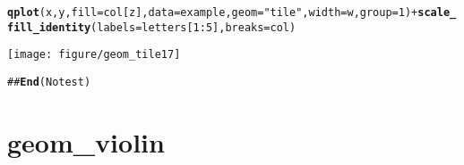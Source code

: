 \documentclass[a4paper,titlepage]{tufte-handout}\usepackage{graphicx, color}
\makeatletter
\def\maxwidth{ %
  \ifdim\Gin@nat@width>\linewidth
    \linewidth
  \else
    \Gin@nat@width
  \fi
}
\newcommand{\hlfunctioncall}[1]{\textcolor[rgb]{0.501960784313725,0,0.329411764705882}{\textbf{#1}}}%
\newcommand{\hlstring}[1]{\textcolor[rgb]{0.6,0.6,1}{#1}}%
\newcommand{\hlcomment}[1]{\textcolor[rgb]{0.180392156862745,0.6,0.341176470588235}{#1}}%
\newenvironment{kframe}{%
 \def\at@end@of@kframe{}%
 \ifinner\ifhmode%
  \def\at@end@of@kframe{\end{minipage}}%
  \begin{minipage}{\columnwidth}%
 \fi\fi%
 \def\FrameCommand##1{\hskip\@totalleftmargin \hskip-\fboxsep
 \colorbox{shadecolor}{##1}\hskip-\fboxsep
     \hskip-\linewidth \hskip-\@totalleftmargin \hskip\columnwidth}%
 \MakeFramed {\advance\hsize-\width
   \@totalleftmargin\z@ \linewidth\hsize
   \@setminipage}}%
 {\par\unskip\endMakeFramed%
 \at@end@of@kframe}
\newenvironment{knitrout}{}{} %
\makeatother
\begin{document}
\begin{knitrout}
\begin{kframe}
\begin{alltt}
\hlfunctioncall{qplot}(x, y, fill=col[z], data=example, geom=\hlstring{"tile"}, width=w, group=1) + \hlfunctioncall{scale_fill_identity}(labels=letters[1:5], breaks=col)
\end{alltt}
\end{kframe}\texttt{[image: figure/geom\_tile17]} \begin{kframe}\begin{alltt}
\hlcomment{## \hlfunctioncall{End}(No test)}
\end{alltt}
\end{kframe}
\end{knitrout}


\section{geom\_violin}
\end{document}
